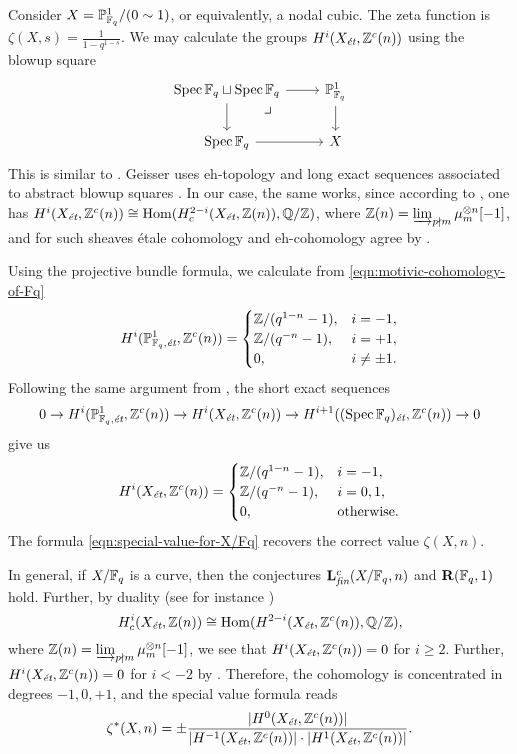 \documentclass{article}
\numberwithin{equation}{section}
\begin{document}
\begin{example}
  Consider $X = \PP^1_{\FF_q}/(0\sim 1)$, or equivalently, a nodal cubic.
  The zeta function is $\zeta (X,s) = \frac{1}{1 - q^{1-s}}$.  We may calculate
  the groups $H^i (X_\et, \ZZ^c (n))$ using the blowup square
  \[ \begin{tikzcd}
      \Spec \FF_q \sqcup \Spec \FF_q \ar{r}\ar{d}\tikzpb & \PP^1_{\FF_q} \ar{d} \\
      \Spec \FF_q \ar{r} & X
    \end{tikzcd} \]
  This is similar to \cite[\S 8, Example~2]{Geisser-2006}. Geisser uses
  eh-topology and long exact sequences associated to abstract blowup squares
  \cite[Proposition~3.2]{Geisser-2006}. In our case, the same works, since
  according to \cite[Theorem~I]{Beshenov-Weil-etale-1}, one has
  $H^i (X_\et, \ZZ^c (n)) \cong \Hom (H^{2-i}_c (X_\et, \ZZ (n)),\QQ/\ZZ)$,
  where $\ZZ (n) = \varinjlim_{p\nmid m} \mu_m^{\otimes n} [-1]$, and
  for such sheaves étale cohomology and eh-cohomology agree by
  \cite[Theorem~3.6]{Geisser-2006}.

  Using the projective bundle formula, we calculate from
  \eqref{eqn:motivic-cohomology-of-Fq}
  \[ H^i (\PP^1_{\FF_q,\et}, \ZZ^c (n)) = \begin{cases}
      \ZZ/(q^{1-n} - 1), & i = -1, \\
      \ZZ/(q^{-n} - 1), & i = +1, \\
      0, & i \ne \pm 1.
    \end{cases} \]
  Following the same argument from \cite[\S 8, Example~2]{Geisser-2006},
  the short exact sequences
  \[ 0 \to H^i (\PP^1_{\FF_q,\et}, \ZZ^c (n)) \to
    H^i (X_\et, \ZZ^c (n)) \to
    H^{i+1} ((\Spec \FF_q)_\et, \ZZ^c (n)) \to 0 \]
  give us
  \[ H^i (X_\et, \ZZ^c (n)) = \begin{cases}
      \ZZ/(q^{1-n} - 1), & i = -1, \\
      \ZZ/(q^{-n} - 1), & i = 0,1, \\
      0, & \text{otherwise}.
    \end{cases} \]
  The formula \eqref{eqn:special-value-for-X/Fq} recovers the correct value
  $\zeta (X,n)$.
\end{example}

\begin{example}
  In general, if $X/\FF_q$ is a curve, then the conjectures
  $\mathbf{L}_\fin^c (X/\FF_q,n)$ and $\mathbf{R} (\FF_q,1)$ hold.
  Further, by duality
  (see for instance \cite[Theorem~1]{Beshenov-Weil-etale-1})
  $$H^i_c (X_\et, \ZZ(n)) \cong \Hom (H^{2-i} (X_\et, \ZZ^c (n)), \QQ/\ZZ),$$
  where
  $\ZZ (n) = \varinjlim_{p\nmid m} \mu_m^{\otimes n} [-1]$,
  we see that $H^i (X_\et, \ZZ^c (n)) = 0$ for $i \ge 2$. Further,
  $H^i (X_\et, \ZZ^c(n)) = 0$ for $i < -2$ by
  \cite[Lemma~4.1]{Beshenov-Weil-etale-1}. Therefore, the cohomology is
  concentrated in degrees $-1, 0, +1$, and the special value formula reads
  \[ \zeta^* (X,n) =
    \pm \frac{|H^0 (X_\et, \ZZ^c (n))|}{|H^{-1} (X_\et, \ZZ^c (n))|\cdot |H^1 (X_\et, \ZZ^c (n))|}. \]
\end{example}
\end{document}
